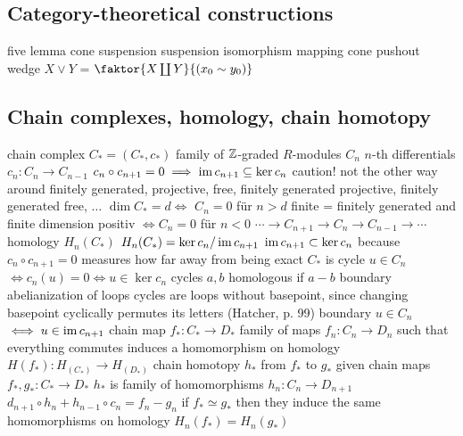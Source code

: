 \subsection{Category-theoretical constructions}
\begin{outline}
    \1 five lemma
    \1 cone
    \1 suspension
    \1 suspension isomorphism
    \1 mapping cone
    \1 pushout
    \1 wedge $X\vee Y$ = $\faktor{X\coprod Y}{(x_0\sim y_0)}$
\end{outline}

\subsection{Chain complexes, homology, chain homotopy}
\begin{outline}
    \1 chain complex $C_*=(C_*,c_*)$ 
        \2 family of $\mathbb{Z}$-graded $R$-modules $C_n$
        \2 $n$-th differentials $c_n:C_n\rightarrow C_{n-1}$
            \3 $c_n \circ c_{n+1}=0 \implies \operatorname{im} c_{n+1} \subseteq \ker c_n$
            \3 caution! not the other way around 
        \2 finitely generated, projective, free, finitely generated projective, finitely generated free, $\ldots$
        \2 $\dim C_* = d \iff$ $C_n = 0$ für $n>d$ 
        \2 finite = finitely generated and finite dimension
        \2 positiv $\iff C_n = 0$ für $n < 0$
        \2 $\cdots \longrightarrow C_{n+1} \longrightarrow C_{n} \longrightarrow C_{n-1} \longrightarrow \cdots$
    \1 homology $H_n(C_*)$
        \2 $H_n(C_*)=\ker c_n / \operatorname{im} c_{n+1}$
            \3 $\operatorname{im} c_{n+1} \subset \ker c_n$ because $c_{n} \circ c_{n+1} = 0$
            \3 measures how far away from being exact $C_*$ is
        \2 cycle $u \in C_n$ $\iff c_n(u)=0 \iff u \in \ker c_n$
            \3 cycles $a,b$ homologous if $a-b$ boundary
            \3 abelianization of loops
                \4 cycles are loops without basepoint, since changing basepoint cyclically permutes its letters (Hatcher, p. 99)
        \2 boundary $u \in C_n$ $\iff u \in \operatorname{im} c_{n+1}$
    \1 chain map $f_*:C_*\rightarrow D_*$
        \2 family of maps $f_n:C_n\rightarrow D_n$ such that everything commutes
        \2 induces a homomorphism on homology $H(f_*):H_(C_*)\rightarrow H_(D_*)$
    \1 chain homotopy $h_*$ from $f_*$ to $g_*$
        \2 given chain maps $f_*,g_*:C_*\rightarrow D_*$ 
        \2 $h_*$ is family of homomorphisms $h_n:C_n\rightarrow D_{n+1}$
        \2 $d_{n+1}\circ h_n + h_{n-1}\circ c_n = f_n - g_n$
        \2 if $f_*\simeq g_*$ then they induce the same homomorphisms on homology $H_n(f_*)=H_n(g_*)$

\end{outline}
